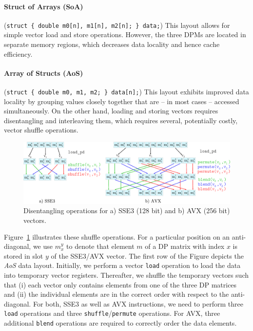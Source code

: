 \documentclass[runningheads,a4paper]{llncs}
\begin{document}
\paragraph*{Struct of Arrays (SoA)} ({\small\texttt{struct \{ double m0[n], m1[n], m2[n]; \} data;}})
This layout allows for simple vector load and store operations.
However, the three DPMs are located in separate memory regions, which decreases
data locality and hence cache efficiency.

\paragraph*{Array of Structs (AoS)} ({\small\texttt{struct \{ double m0, m1, m2; \}
data[n];}}) This layout exhibits improved data locality by grouping values
closely together that are -- in most cases -- accessed simultaneously. On the
other hand, loading and storing vectors requires disentangling and interleaving
them, which requires several, potentially costly, vector shuffle operations.

\begin{figure}[ht!]
  \centering
  \includegraphics[scale=0.6]{figures/shuffle.pdf}
  \caption{Disentangling operations for a) SSE3 (128 bit) and b) AVX (256 bit) vectors.}
  \label{fig:shufflesse}
\end{figure}

Figure~\ref{fig:shufflesse} illustrates these shuffle operations.
For a particular position on an anti-diagonal, we use $m_x^y$ to denote that element $m$ of a DP matrix with index $x$ 
is stored in slot $y$ of the SSE3/AVX vector.
The first row of the Figure depicts the {\em AoS} data layout.
Initially, we perform a vector \texttt{load} operation
to load the data into temporary vector registers.
Thereafter, we shuffle the temporary vectors such that (i) each vector only contains elements from one of the three DP matrices and
(ii) the individual elements are in the correct order with respect to  the anti-diagonal.
For both, SSE3 as well as AVX instructions, we need to perform three \texttt{load} operations and three \texttt{shuffle}/\texttt{permute} operations.
For AVX, three additional \texttt{blend} operations are required to correctly order the data elements.
\end{document}
